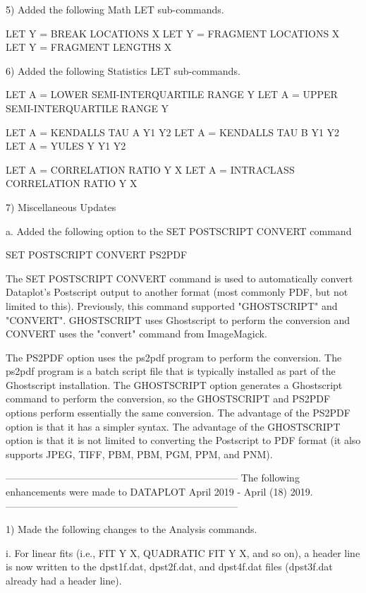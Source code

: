  5) Added the following Math LET sub-commands.

      LET Y = BREAK LOCATIONS X
      LET Y = FRAGMENT LOCATIONS X
      LET Y = FRAGMENT LENGTHS X

 6) Added the following Statistics LET sub-commands.

      LET A = LOWER SEMI-INTERQUARTILE RANGE Y
      LET A = UPPER SEMI-INTERQUARTILE RANGE Y

      LET A = KENDALLS TAU A  Y1 Y2
      LET A = KENDALLS TAU B  Y1 Y2
      LET A = YULES Y  Y1 Y2

      LET A = CORRELATION RATIO Y X
      LET A = INTRACLASS CORRELATION RATIO Y X

 7) Miscellaneous Updates

    a. Added the following option to the SET POSTSCRIPT CONVERT
       command

          SET POSTSCRIPT CONVERT PS2PDF

       The SET POSTSCRIPT CONVERT command is used to automatically
       convert Dataplot's Postscript output to another format (most
       commonly PDF, but not limited to this).  Previously, this
       command supported "GHOSTSCRIPT" and "CONVERT".  GHOSTSCRIPT
       uses Ghostscript to perform the conversion and CONVERT uses
       the "convert" command from ImageMagick.

       The PS2PDF option uses the ps2pdf program to perform the
       conversion.  The ps2pdf program is a batch script file that
       is typically installed as part of the Ghostscript installation.
       The GHOSTSCRIPT option generates a Ghostscript command to
       perform the conversion, so the GHOSTSCRIPT and PS2PDF options
       perform essentially the same conversion.  The advantage of the
       PS2PDF option is that it has a simpler syntax.  The advantage
       of the GHOSTSCRIPT option is that it is not limited to
       converting the Postscript to PDF format (it also supports
       JPEG, TIFF, PBM, PBM, PGM, PPM, and PNM).

-----------------------------------------------------------------------
The following enhancements were made to DATAPLOT
April 2019 - April (18) 2019.
-----------------------------------------------------------------------

 1) Made the following changes to the Analysis commands.

      i. For linear fits (i.e., FIT Y X, QUADRATIC FIT Y X, and so on), a
         header line is now written to the dpst1f.dat, dpst2f.dat, and
         dpst4f.dat files (dpst3f.dat already had a header line).

